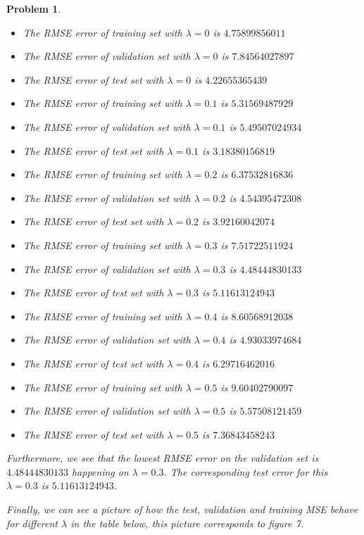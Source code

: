 \documentclass[12pt]{article}
\newtheorem{problem}{Problem}%
\begin{document}
\begin{problem}
\begin{enumerate}
\begin{itemize}
\item The RMSE error of training set with $\lambda = 0$ is $4.75899856011$
\item The RMSE error of validation set with $\lambda = 0$ is $7.84564027897$
\item The RMSE error of test set with $\lambda = 0$ is $4.22655365439$
\item The RMSE error of training set with $\lambda = 0.1$ is $5.31569487929$
\item The RMSE error of validation set with $\lambda = 0.1$ is $5.49507024934$
\item The RMSE error of test set with $\lambda = 0.1$ is $3.18380156819$
\item The RMSE error of training set with $\lambda = 0.2$ is $6.37532816836$
\item The RMSE error of validation set with $\lambda = 0.2$ is $4.54395472308$
\item The RMSE error of test set with $\lambda = 0.2$ is $3.92160042074$
\item The RMSE error of training set with $\lambda = 0.3$ is $7.51722511924$
\item The RMSE error of validation set with $\lambda = 0.3$ is $4.48444830133$
\item The RMSE error of test set with $\lambda = 0.3$ is $5.11613124943$
\item The RMSE error of training set with $\lambda = 0.4$ is $8.60568912038$
\item The RMSE error of validation set with $\lambda = 0.4$ is $4.93033974684$
\item The RMSE error of test set with $\lambda = 0.4$ is $6.29716462016$
\item The RMSE error of training set with $\lambda = 0.5$ is $9.60402790097$
\item The RMSE error of validation set with $\lambda = 0.5$ is $5.57508121459$
\item The RMSE error of test set with $\lambda = 0.5$ is $7.36843458243$
\end{itemize}

Furthermore, we see that the lowest RMSE error on the validation set is $ 4.48444830133$ happening on $\lambda = 0.3$. The corresponding test error for this $\lambda = 0.3$ is $5.11613124943$.

Finally, we can see a picture of how the test, validation and training MSE behave for different $\lambda$ in the table below, this picture corresponds to figure 7.


\end{enumerate}
\end{problem}
\end{document}
